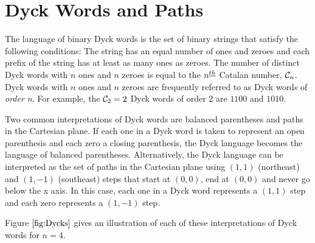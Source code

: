 \section{Dyck Words and Paths} \label{sec:Dycks}

The language of binary Dyck words is the set of binary strings that satisfy the following conditions: The string has an equal number of ones and zeroes and each prefix of the string has at least as many ones as zeroes.  The number of distinct Dyck words with $n$ ones and $n$ zeroes is equal to the $n^{\underline{th}}$ Catalan number, $\mathcal{C}_n$.  Dyck words with $n$ ones and $n$ zeroes are frequently referred to as Dyck words of \emph{order n}.
For example, the $\mathcal{C}_2=2$ Dyck words of order 2 are $1100$ and $1010$.

Two common interpretations of Dyck words are balanced parentheses and paths in the Cartesian plane. If each one in a Dyck word is taken to represent an open parenthesis and each zero a closing parenthesis, the Dyck language becomes the language of balanced parentheses.  Alternatively, the Dyck language can be interpreted as the set of paths in the Cartesian plane using $(1,1)$ (northeast) and $(1,-1)$ (southeast) steps that start at $(0,0)$, end at $(0,0)$ and never go below the x axis. In this case, each one in a Dyck word represents a $(1,1)$ step and each zero represents a $(1,-1)$ step.

Figure $\ref{fig:Dycks}$ gives an illustration of each of these interpretations of Dyck words for $n=4$.


